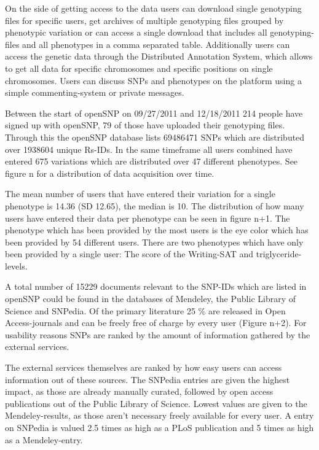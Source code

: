 \documentclass[10pt]{article}
\begin{document}
On the side of getting access to the data users can download single genotyping files for specific users, get archives of multiple genotyping files grouped by phenotypic variation or can access a single download that includes all genotyping-files and all phenotypes in a comma separated table. Additionally users can access the genetic data through the Distributed Annotation System, which allows to get all data for specific chromosomes and specific positions on single chromosomes. Users can discuss SNPs and phenotypes on the platform using a simple commenting-system or private messages. 

Between the start of openSNP on 09/27/2011 and 12/18/2011 214 people have signed up with openSNP, 79 of those have uploaded their genotyping files. Through this the openSNP database lists 69486471 SNPs which are distributed over 1938604 unique Rs-IDs. In the same timeframe all users combined have entered 675 variations which are distributed over 47 different phenotypes. See figure n for a distribution of data acquisition over time. 

The mean number of users that have entered their variation for a single phenotype is 14.36 (SD 12.65), the median is 10. The distribution of how many users have entered their data per phenotype can be seen in figure n+1. The phenotype which has been provided by the most users is the eye color which has been provided by 54 different users. There are two phenotypes which have only been provided by a single user: The score of the Writing-SAT and triglyceride-levels. 

A total number of 15229 documents relevant to the SNP-IDs which are listed in openSNP could be found in the databases of Mendeley, the Public Library of Science and SNPedia. Of the primary literature 25 \% are released in Open Access-journals and can be freely free of charge by every user (Figure n+2). For usability reasons SNPs are ranked by the amount of information gathered by the external services. 

The external services themselves are ranked by how easy users can access information out of these sources. The SNPedia entries are given the highest impact, as those are already manually curated, followed by open access publications out of the Public Library of Science. Lowest values are given to the Mendeley-results, as those aren't necessary freely available for every user. A entry on SNPedia is valued 2.5 times as high as a PLoS publication and 5 times as high as a Mendeley-entry.  
\end{document}
